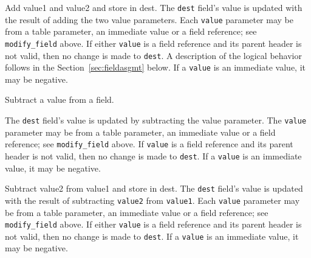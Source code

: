 \documentclass[12pt]{article}
\begin{document}

{ %
Add value1 and value2 and store in dest.
}
{ %
}
{ %
The \texttt{dest} field's value is updated with the result of adding
the two value parameters. Each \texttt{value} parameter may be from a
table parameter, an immediate value or a field reference; see \texttt{modify_field} above. If either \texttt{value}
is a field reference and its parent header is not valid, then no
change is made to \texttt{dest}.  A description of the logical
behavior follows in the Section~\ref{sec:fieldasgmt} below.  If a
\texttt{value} is an immediate value, it may be negative.
}


{ %
Subtract a value from a field.
}
{ %
}
{ %
The \texttt{dest} field's value is updated by subtracting the value parameter. The \texttt{value} parameter 
may be from a table parameter, an immediate value or a field reference; see \texttt{modify_field} above.  
If \texttt{value} is a field reference 
and its parent header is not valid, then no change is made to \texttt{dest}. 
If a \texttt{value} is an immediate value, it may be negative.

}


{ %
Subtract value2 from value1 and store in dest.
}
{ %
}
{ %
The \texttt{dest} field's value is updated with the result of subtracting
\texttt{value2} from \texttt{value1}. Each \texttt{value} parameter may be from a
table parameter, an immediate value or a field reference; see \texttt{modify_field} above.  If either \texttt{value}
is a field reference and its parent header is not valid, then no
change is made to \texttt{dest}. If a
\texttt{value} is an immediate value, it may be negative.
}
\end{document}
